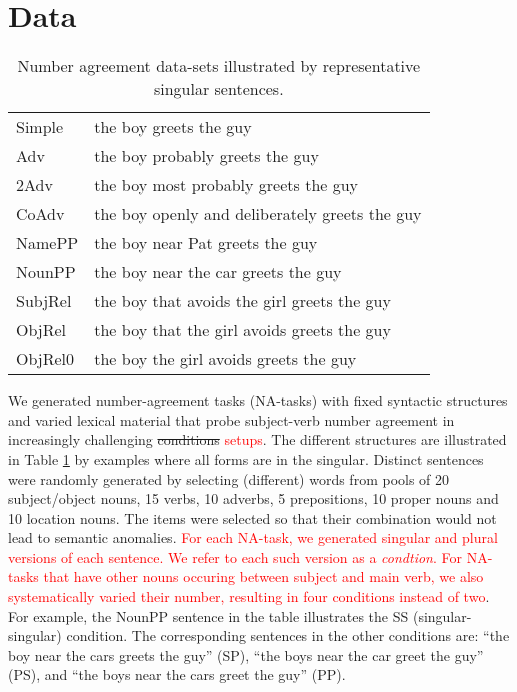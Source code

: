 \section{Data}

\begin{table}[tb]
  \centering
  \begin{footnotesize}
  \begin{tabular}{l@{\hskip1pt}l}
    \B Simple & the boy greets the guy\\
    \B Adv & the boy probably greets the guy\\
    \B 2Adv & the boy most probably greets the guy\\
    \B CoAdv &  the boy openly and deliberately greets the guy\\
    \B NamePP & the boy near Pat greets the guy\\
    \B NounPP & the boy near the car greets the guy\\
    \B SubjRel & the boy that avoids the girl greets the guy\\
    \B ObjRel  & the boy that the girl avoids greets the guy \\
    \B ObjRel0 &  the boy the girl avoids greets the guy\\
  \end{tabular}
  \end{footnotesize}
  \caption{Number agreement data-sets illustrated by representative
    singular sentences.}
  \label{tab:data-sets}
\end{table}

We generated number-agreement tasks (NA-tasks) with fixed syntactic structures and varied
lexical material that probe subject-verb number agreement in
increasingly challenging \sout{conditions} \textcolor{red}{setups}. The different structures are
illustrated in Table \ref{tab:data-sets} by examples where all forms
are in the singular. Distinct sentences were randomly generated by
selecting (different) words from pools of 20 subject/object nouns, 15
verbs, 10 adverbs, 5 prepositions, 10 proper nouns and 10 location
nouns. The items were selected so that their combination would not
lead to semantic anomalies. \textcolor{red}{For each NA-task, we generated singular and plural
versions of each sentence. We refer to each such version as a \textit{condtion}. For NA-tasks that have other nouns occuring between
subject and main verb, we also systematically varied their number, resulting in four conditions instead of two}. For example, the
NounPP sentence in the table illustrates the SS (singular-singular)
condition. The corresponding sentences in the other conditions are:
``the boy near the cars greets the guy'' (SP), ``the boys near the car
greet the guy'' (PS), and ``the boys near the cars greet the guy''
(PP). 


